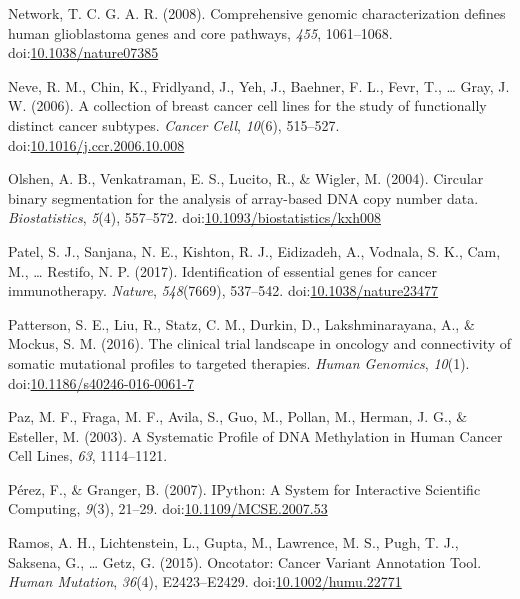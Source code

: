 \documentclass[man]{apa6}
\begin{document}
\hypertarget{ref-thecancergenomeatlasresearchnetwork2008}{}
Network, T. C. G. A. R. (2008). Comprehensive genomic characterization
defines human glioblastoma genes and core pathways, \emph{455},
1061--1068.
doi:\href{https://doi.org/10.1038/nature07385}{10.1038/nature07385}

\hypertarget{ref-neve2006}{}
Neve, R. M., Chin, K., Fridlyand, J., Yeh, J., Baehner, F. L., Fevr, T.,
\ldots{} Gray, J. W. (2006). A collection of breast cancer cell lines
for the study of functionally distinct cancer subtypes. \emph{Cancer
Cell}, \emph{10}(6), 515--527.
doi:\href{https://doi.org/10.1016/j.ccr.2006.10.008}{10.1016/j.ccr.2006.10.008}

\hypertarget{ref-olshen2004}{}
Olshen, A. B., Venkatraman, E. S., Lucito, R., \& Wigler, M. (2004).
Circular binary segmentation for the analysis of array-based DNA copy
number data. \emph{Biostatistics}, \emph{5}(4), 557--572.
doi:\href{https://doi.org/10.1093/biostatistics/kxh008}{10.1093/biostatistics/kxh008}

\hypertarget{ref-patel2017}{}
Patel, S. J., Sanjana, N. E., Kishton, R. J., Eidizadeh, A., Vodnala, S.
K., Cam, M., \ldots{} Restifo, N. P. (2017). Identification of essential
genes for cancer immunotherapy. \emph{Nature}, \emph{548}(7669),
537--542.
doi:\href{https://doi.org/10.1038/nature23477}{10.1038/nature23477}

\hypertarget{ref-patterson2016}{}
Patterson, S. E., Liu, R., Statz, C. M., Durkin, D., Lakshminarayana,
A., \& Mockus, S. M. (2016). The clinical trial landscape in oncology
and connectivity of somatic mutational profiles to targeted therapies.
\emph{Human Genomics}, \emph{10}(1).
doi:\href{https://doi.org/10.1186/s40246-016-0061-7}{10.1186/s40246-016-0061-7}

\hypertarget{ref-paz2003}{}
Paz, M. F., Fraga, M. F., Avila, S., Guo, M., Pollan, M., Herman, J. G.,
\& Esteller, M. (2003). A Systematic Profile of DNA Methylation in Human
Cancer Cell Lines, \emph{63}, 1114--1121.

\hypertarget{ref-perez2007}{}
Pérez, F., \& Granger, B. (2007). IPython: A System for Interactive
Scientific Computing, \emph{9}(3), 21--29.
doi:\href{https://doi.org/10.1109/MCSE.2007.53}{10.1109/MCSE.2007.53}

\hypertarget{ref-ramos2015a}{}
Ramos, A. H., Lichtenstein, L., Gupta, M., Lawrence, M. S., Pugh, T. J.,
Saksena, G., \ldots{} Getz, G. (2015). Oncotator: Cancer Variant
Annotation Tool. \emph{Human Mutation}, \emph{36}(4), E2423--E2429.
doi:\href{https://doi.org/10.1002/humu.22771}{10.1002/humu.22771}
\end{document}
